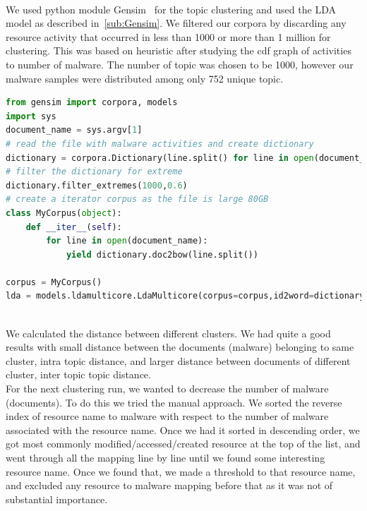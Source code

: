 \\
We used python module Gensim~\cite[Gensim]{gensim}  for the topic clustering and used the LDA model as described in~\autoref{sub:Gensim}.
We filtered our corpora by discarding any resource activity that occurred in less than 1000 or more than 1 million for clustering.
This was based on heuristic after studying the cdf graph of activities to number of malware.
The number of topic was chosen to be 1000, however our malware samples were distributed among only 752 unique topic.
\begin{lstlisting}[float,floatplacement=H,language=python,caption={Script to run Gensim LDA},label={lbl:lda.py}]
from gensim import corpora, models
import sys
document_name = sys.argv[1]
# read the file with malware activities and create dictionary
dictionary = corpora.Dictionary(line.split() for line in open(document_name))
# filter the dictionary for extreme
dictionary.filter_extremes(1000,0.6)
# create a iterator corpus as the file is large 80GB
class MyCorpus(object):
    def __iter__(self):
        for line in open(document_name):
            yield dictionary.doc2bow(line.split())

corpus = MyCorpus()
lda = models.ldamulticore.LdaMulticore(corpus=corpus,id2word=dictionary,num_topics=1000)
\end{lstlisting}
\\
We calculated the distance between different clusters. We had quite a good results with small distance between the documents (malware) belonging to same cluster, intra topic distance, and larger distance between documents of different cluster, inter topic topic distance.
\\
For the next clustering run, we wanted to decrease the number of malware (documents).
To do this we tried the manual approach. We sorted the reverse index of resource name to malware with respect to the number of malware associated with the resource name.
Once we had it sorted in descending order, we got most commonly modified/accessed/created resource at the top of the list, and went through all the mapping line by line until we found some interesting resource name.
Once we found that, we made a threshold to that resource name, and excluded any resource to malware mapping before that as it was not of substantial importance.\\
